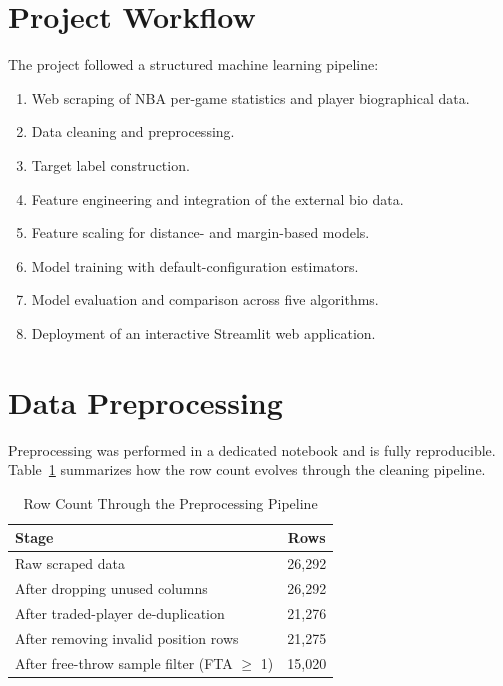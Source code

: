 \documentclass[conference]{IEEEtran}
\begin{document}

\section{Project Workflow}

The project followed a structured machine learning pipeline:

\begin{enumerate}
\item Web scraping of NBA per-game statistics and player biographical data.
\item Data cleaning and preprocessing.
\item Target label construction.
\item Feature engineering and integration of the external bio data.
\item Feature scaling for distance- and margin-based models.
\item Model training with default-configuration estimators.
\item Model evaluation and comparison across five algorithms.
\item Deployment of an interactive Streamlit web application.
\end{enumerate}


\section{Data Preprocessing}

Preprocessing was performed in a dedicated notebook and is fully reproducible. Table~\ref{tab:funnel} summarizes how the row count evolves through the cleaning pipeline.

\begin{table}[H]
\centering
\caption{Row Count Through the Preprocessing Pipeline}
\begin{tabular}{|l|c|}
\hline
\textbf{Stage} & \textbf{Rows} \\
\hline
Raw scraped data & 26,292 \\
\hline
After dropping unused columns & 26,292 \\
\hline
After traded-player de-duplication & 21,276 \\
\hline
After removing invalid position rows & 21,275 \\
\hline
After free-throw sample filter (FTA $\geq$ 1) & 15,020 \\
\hline
\end{tabular}
\label{tab:funnel}
\end{table}
\end{document}
